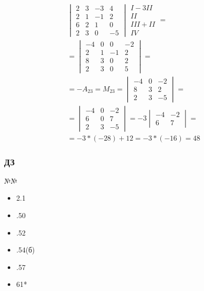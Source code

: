 \documentclass{article}
\begin{document}
\begin{gather*}
	\begin{vmatrix}
		2 & 3 & -3 & 4 \\
		2 & 1 & -1 & 2 \\
		6 & 2 & 1 & 0 \\
		2 & 3 & 0 & -5
	\end{vmatrix}
	\begin{matrix}
		I - 3II \\
		II \\
		III + II \\
		IV
	\end{matrix} = \\
	= \begin{vmatrix}
		-4 & 0 & 0 & -2 \\
		2 & 1 & -1 & 2 \\
		8 & 3 & 0 & 2 \\
		2 & 3 & 0 & 5
	\end{vmatrix} = \\
	= -A_{23} = M_{23} = \begin{vmatrix}
		-4 & 0 & -2 \\
		8 & 3 & 2 \\
		2 & 3 & -5
	\end{vmatrix} = \\
	= \begin{vmatrix}
		-4 & 0 & -2 \\
		6 & 0 & 7 \\
		2 & 3 & -5
	\end{vmatrix}
	= -3
	\begin{vmatrix}
		-4 & -2 \\
		6 & 7
	\end{vmatrix} = \\
	= -3 * (-28) + 12 = -3 * (-16) = 48
\end{gather*}

\subsubsection{ДЗ}

№№
\begin{itemize}
\item{2.1}
\item{.50}
\item{.52}
\item{.54(б)}
\item{.57}
\item{61*}
\end{itemize}
\end{document}

